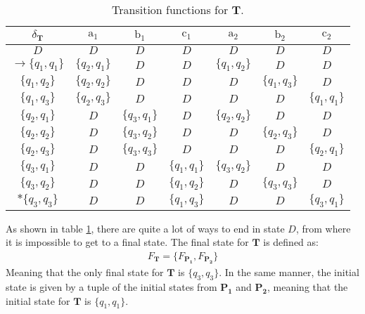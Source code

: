 \begin{table}[H]
    \centering
    \begin{tabular}{|c||c|c|c|c|c|c|}
    \hline
    $\delta_{\mathbf{T}}$    & $\mathrm{a_1}$    &   $\mathrm{b_1}$   &    $\mathrm{c_1}$  &   $\mathrm{a_2}$   &   $\mathrm{b_2}$   &   $\mathrm{c_2}$ \\ \hline \hline
         
    $D$   & $D$     & $D$  & $D$    & $D$   & $D$   & $D$   \\ \hline
    
    $\rightarrow \{q_1, q_1\}$& $\{q_2, q_1\}$     & $D$  & $D$    & $\{q_1, q_2\}$   & $D$   & $D$   \\ \hline
    
    $\{q_1, q_2\}$  & $\{q_2, q_2\}$    & $D$   & $D$   & $D$   & $\{q_1, q_3\}$    & $D$   \\ \hline
   
    $\{q_1, q_3\}$  &   $\{q_2, q_3\}$  &   $D$ &   $D$ &   $D$ &   $D$ &   $\{q_1, q_1\}$  \\ \hline
   
    $\{q_2, q_1\}$  &   $D$ &   $\{q_3, q_1\}$  &   $D$ &   $\{q_2, q_2\}$  &   $D$ &   $D$ \\ \hline
   
    $\{q_2, q_2\}$  &   $D$ &   $\{q_3, q_2\}$  &   $D$ &   $D$ &   $\{q_2, q_3\}$  &   $D$ \\ \hline
   
    $\{q_2, q_3\}$  &   $D$ &   $\{q_3, q_3\}$  &   $D$ &   $D$ &   $D$ &   $\{q_2, q_1\}$  \\ \hline
   
    $\{q_3, q_1\}$  &   $D$ &   $D$ &   $\{q_1, q_1\}$  &   $\{q_3, q_2\}$  &   $D$ &   $D$ \\ \hline
   
    $\{q_3, q_2\}$  &   $D$ &   $D$ &   $\{q_1, q_2\}$  &   $D$ &   $\{q_3, q_3\}$  &   $D$ \\ \hline
    
    $*\{q_3, q_3\}$ &   $D$ &   $D$ &   $\{q_1, q_3\}$  &   $D$ &   $D$ &   $\{q_3, q_1\}$  \\ \hline
    
    
    \end{tabular}
    \caption{Transition functions for $\mathbf{T}$.}
    \label{tab:Tt}
\end{table}

As shown in table \ref{tab:Tt}, there are quite a lot of ways to end in state $D$, from where it is impossible to get to a final state. The final state for $\mathbf{T}$ is defined as:
\begin{gather*}
    F_{\mathbf{T}} = \{F_{\mathbf{P_1}}, F_{\mathbf{P_2}}\}
\end{gather*}
Meaning that the only final state for $\mathbf{T}$ is $\{q_3,q_3\}$. In the same manner, the initial state is given by a tuple of the initial states from $\mathbf{P_1}$ and $\mathbf{P_2}$, meaning that the initial state for $\mathbf{T}$ is $\{q_1, q_1\}$. 

